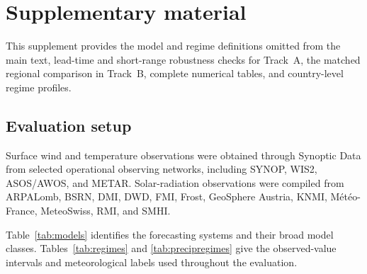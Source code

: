 \documentclass{article}
\begin{document}



\clearpage
\appendix
\section{Supplementary material}\label{app:supp}
\setcounter{table}{0}
\setcounter{figure}{0}
\renewcommand{\thetable}{S\arabic{table}}
\renewcommand{\thefigure}{S\arabic{figure}}

This supplement provides the model and regime definitions omitted
from the main text, lead-time and short-range robustness checks for Track~A, the
matched regional comparison in Track~B, complete numerical tables, and
country-level regime profiles.

\subsection{Evaluation setup}
\label{app:setup}

Surface wind and temperature observations were obtained through Synoptic
Data from selected operational observing networks, including SYNOP, WIS2,
ASOS/AWOS, and METAR. Solar-radiation observations were compiled from
ARPALomb, BSRN, DMI, DWD, FMI, Frost, GeoSphere Austria, KNMI,
Météo-France, MeteoSwiss, RMI, and SMHI.

Table~\ref{tab:models} identifies the forecasting systems and their broad
model classes. Tables~\ref{tab:regimes} and \ref{tab:precipregimes} give the
observed-value intervals and meteorological labels used throughout the
evaluation.

\end{document}
